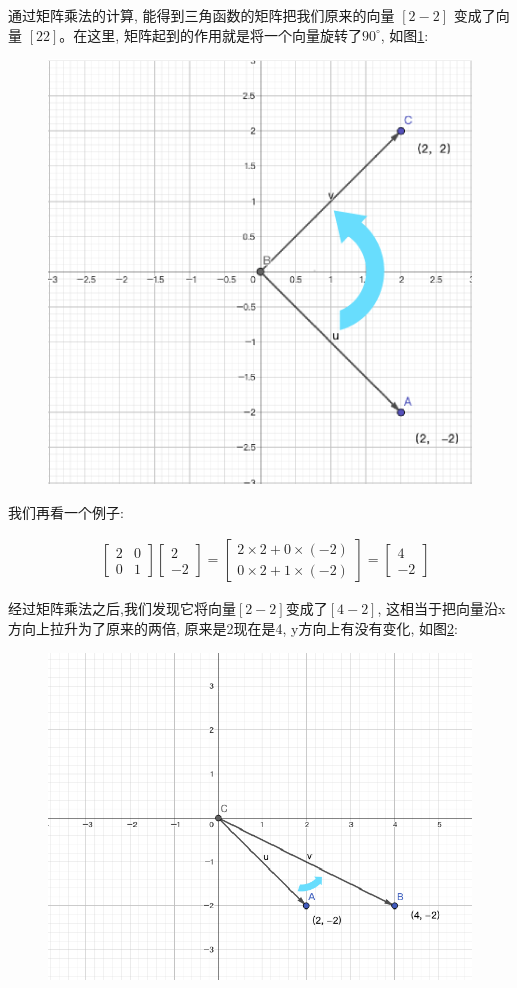 通过矩阵乘法的计算, 能得到三角函数的矩阵把我们原来的向量 $[2 -2]$ 变成了向量 $[2 2]$。在这里, 矩阵起到的作用就是将一个向量旋转了$90^{\circ}$, 如图\ref{fig:img19_1}: 

\begin{figure}[ht]
  \centering
  \includegraphics[width=0.5\linewidth]{asset/20230913133039.png}
  \caption{}
  \label{fig:img19_1}
\end{figure}


我们再看一个例子: 

\begin{align*}
& \begin{bmatrix}
2 & 0 \\
0 & 1
\end{bmatrix}
\begin{bmatrix}
2 \\ -2
\end{bmatrix} = \begin{bmatrix}
2 \times 2 + 0 \times (-2) \\
0 \times 2 + 1 \times (-2)
\end{bmatrix} = \begin{bmatrix} 4 \\ -2 \end{bmatrix}
\end{align*}

经过矩阵乘法之后,我们发现它将向量$[2 -2]$变成了$[4 -2]$, 这相当于把向量沿x方向上拉升为了原来的两倍, 原来是2现在是4, y方向上有没有变化, 如图\ref{fig:img19_2}: 

\begin{figure}[ht]
  \centering
  \includegraphics[width=0.5\linewidth]{asset/20230913135453.png}
  \caption{}
  \label{fig:img19_2}
\end{figure}

